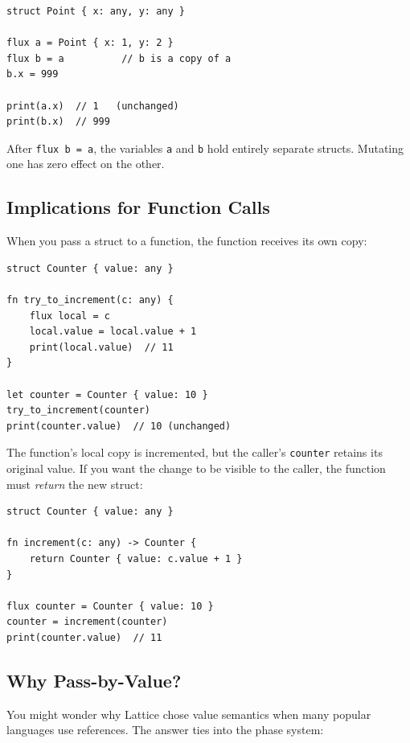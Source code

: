 \begin{lstlisting}[language=Lattice, caption={Pass-by-value in action}]
struct Point { x: any, y: any }

flux a = Point { x: 1, y: 2 }
flux b = a          // b is a copy of a
b.x = 999

print(a.x)  // 1   (unchanged)
print(b.x)  // 999
\end{lstlisting}

After \lstinline|flux b = a|, the variables \lstinline|a| and \lstinline|b|
hold entirely separate structs. Mutating one has zero effect on the other.

\subsection{Implications for Function Calls}

When you pass a struct to a function, the function receives its own copy:

\begin{lstlisting}[language=Lattice, caption={Functions receive copies}]
struct Counter { value: any }

fn try_to_increment(c: any) {
    flux local = c
    local.value = local.value + 1
    print(local.value)  // 11
}

let counter = Counter { value: 10 }
try_to_increment(counter)
print(counter.value)  // 10 (unchanged)
\end{lstlisting}

The function's local copy is incremented, but the caller's
\lstinline|counter| retains its original value. If you want the change to
be visible to the caller, the function must \emph{return} the new struct:

\begin{lstlisting}[language=Lattice, caption={Returning the modified struct}]
struct Counter { value: any }

fn increment(c: any) -> Counter {
    return Counter { value: c.value + 1 }
}

flux counter = Counter { value: 10 }
counter = increment(counter)
print(counter.value)  // 11
\end{lstlisting}

\subsection{Why Pass-by-Value?}

You might wonder why Lattice chose value semantics when many popular
languages use references. The answer ties into the phase system:

